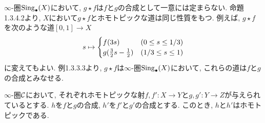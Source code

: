 \documentclass[uplatex, a4paper, 14Q, dvipdfmx]{jsreport}
\begin{document}
\begin{remark}
  $\infty$-圏$\mathrm{Sing}_\bullet(X)$において, $g \star f$は$f$と$g$の合成として一意には定まらない. 
  命題1.3.4.2より, $X$において$g \star f$とホモトピックな道は同じ性質をもつ. 
  例えば, $g \star f$を次のような道$[0,1] \to X$
  \begin{align*}
    s \mapsto 
    \begin{cases}
      f(3s) &(0 \leq s \leq 1/3) \\
      g(\frac{3}{2}s-\frac{1}{2}) &(1/3 \leq s \leq 1)
    \end{cases}
  \end{align*}
  に変えてもよい. 
  例1.3.3.3より, $g \star f$は$\infty$-圏$\mathrm{Sing}_\bullet(X)$において, これらの道は$f$と$g$の合成とみなせる. 
\end{remark}

\begin{prop}
  $\infty$-圏$\mathcal{C}$において, それぞれホモトピックな射$f,f': X \to Y$と$g,g': Y \to Z$が与えられているとする.
  $h$を$f$と$g$の合成, $h'$を$f'$と$g'$の合成とする. 
  このとき, $h$と$h'$はホモトピックである.
\end{prop}
\end{document}
